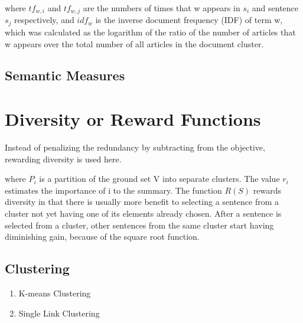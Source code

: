 
where $tf_{w,i}$ and $tf_{w,j}$ are the numbers of times that w appears in $s_i$ and sentence $s_j$ respectively, and
$idf_{w}$ is the inverse document frequency (IDF) of term w, which was calculated as the
logarithm of the ratio of the number of articles that w appears over the total number of all articles in the
document cluster.



\subsection{Semantic Measures}

\section{Diversity or Reward Functions}
Instead of penalizing the redundancy by subtracting from the objective, rewarding diversity is used here.\\


where $P_i$ is a partition of the ground set V into separate clusters. The value $r_i$ estimates the importance of i to
the summary. The function $R(S)$ rewards diversity in that there is usually more benefit to selecting a sentence from a cluster not yet having one of its
elements already chosen. After a sentence is selected from a cluster, other sentences from the same cluster start having diminishing gain, because of the square root function. 


\subsection{Clustering}

\begin{enumerate}
	\item K-means Clustering
	\item Single Link Clustering
\end{enumerate}

